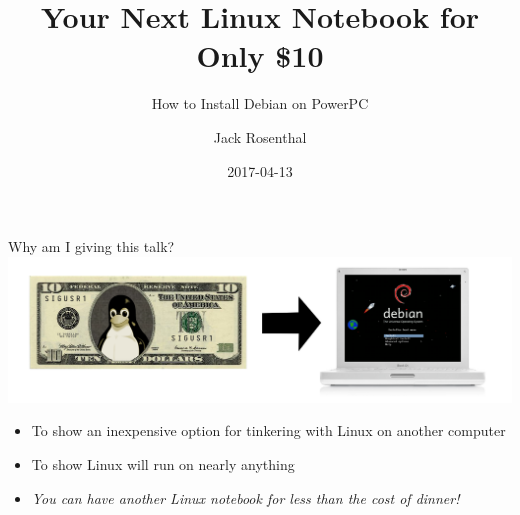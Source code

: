 \documentclass{lug}
\title{Your Next Linux Notebook for Only \$10}
\subtitle{How to Install Debian on PowerPC}
\author{Jack Rosenthal}
\date{2017-04-13}
\institute{Mines Linux Users Group}
\begin{document}
\begin{frame}{Why am I giving this talk?}
    \includegraphics[width=\linewidth]{graphics/10toG4}

    \begin{itemize}[<+->]
        \item To show an inexpensive option for tinkering with Linux on another
            computer
        \item To show Linux will run on nearly anything
        \item \emph{You can have another Linux notebook for less than the cost
            of dinner!}
    \end{itemize}
\end{frame}
\end{document}
